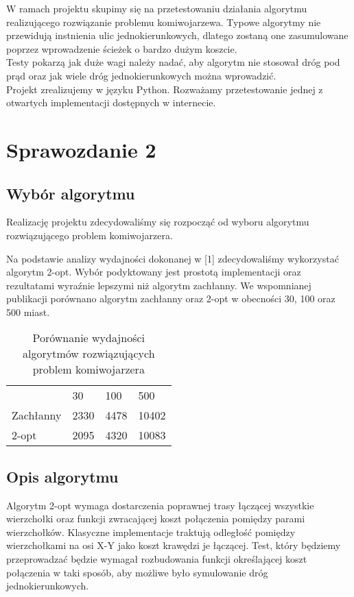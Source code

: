 \documentclass{article}
\begin{document}
W ramach projektu skupimy się na przetestowaniu działania algorytmu realizującego rozwiązanie problemu komiwojarzewa. Typowe algorytmy nie przewidują instnienia ulic jednokierunkowych, dlatego zostaną one zasumulowane poprzez wprowadzenie ścieżek o bardzo dużym koszcie.
\\

Testy pokarzą jak duże wagi należy nadać, aby algorytm nie stosował dróg pod prąd oraz jak wiele dróg jednokierunkowych można wprowadzić.
\\

Projekt zrealizujemy w języku Python. Rozważamy przetestowanie jednej z otwartych implementacji dostępnych w internecie.

\section{Sprawozdanie 2}

\subsection{Wybór algorytmu}
Realizację projektu zdecydowaliśmy się rozpocząć od wyboru algorytmu rozwiązującego problem komiwojarzera.

Na podstawie analizy wydajności dokonanej w [1] zdecydowaliśmy wykorzystać algorytm 2-opt. Wybór podyktowany jest prostotą implementacji oraz rezultatami wyraźnie lepszymi niż algorytm zachłanny. We wspomnianej publikacji porównano algorytm zachłanny oraz 2-opt w obecności 30, 100 oraz 500 miast. \\

\begin{table}[]
\centering
\caption{Porównanie wydajności algorytmów rozwiązujących problem komiwojarzera}
\label{my-label}
\begin{tabular}{llll}
 & 30   & 100  & 500   \\
Zachłanny             & 2330 & 4478 & 10402 \\
2-opt                 & 2095 & 4320 & 10083
\end{tabular}
\end{table}

\subsection{Opis algorytmu}
Algorytm 2-opt wymaga dostarczenia poprawnej trasy łączącej wszystkie wierzchołki oraz funkcji zwracającej koszt połączenia pomiędzy parami wierzchołków. Klasyczne implementacje traktują odległość pomiędzy wierzchołkami na osi X-Y jako koszt krawędzi je łączącej. Test, który będziemy przeprowadzać będzie wymagał rozbudowania funkcji określającej koszt połączenia w taki sposób, aby możliwe było symulowanie dróg jednokierunkowych. \\
\end{document}
